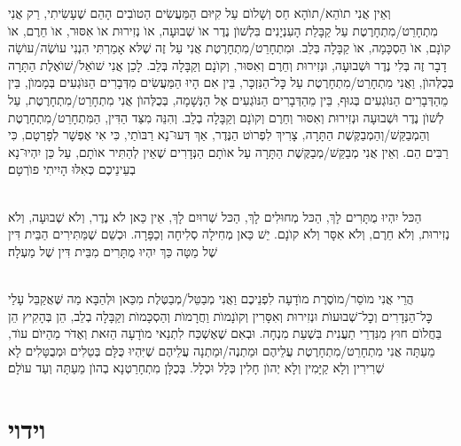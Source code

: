 \documentclass[twoside, openany, parskip=half, 11pt]{book}
\begin{document}
וְאֵין אֲנִי תוׂהֵא/תוׂהָא חַס וְשָׁלוׂם עַל קִיּוּם הַמַּעֲשִׂים הַטוׂבִים הָהֵם שֶׁעָשִׂיתִי, רַק אֲנִי מִתְחָרֵט/מִתְחָרֶטֶת עַל קַבָּלַת הָעִנְיָנִים בִּלְשׁוׂן נֶדֶר אוׂ שְׁבוּעָה, אוׂ נְזִירוּת אוׂ אִסּוּר, אוׂ חֵרֶם, אוׂ קוׂנָם, אוׂ הַסְכָּמָה, אוׂ קַבָּלָה בְּלֵב. וּמִתְחָרֵט/מִתְחָרֶטֶת אֲנִי עַל זֶה שֶׁלּא אָמַרְתִּי הִנְנִי עוׂשֶׂה/עוׂשָׂה דָבָר זֶה בְּלִי נֶדֶר וּשְׁבוּעָה, וּנְזִירוּת וְחֵרֶם וְאִסּוּר, וְקוׂנָם וְקַבָּלָה בְּלֵב. לָכֵן אֲנִי שׁוׂאֵל/שׁוׂאֶלֶת הַתָּרָה בְּכֻלְּהוׂן, וַאֲנִי מִתְחָרֵט/מִתְחָרֶטֶת עַל כׇּל־הַנִּזְכָּר, בֵּין אִם הָיוּ הַמַּעֲשִׂים מִדְּבָרִים הַנּוׂגְעִים בְּמָמוׂן, בֵּין מֵהַדְּבָרִים הַנּוׂגְעִים בְּגוּף, בֵּין מֵהַדְּבָרִים הַנּוׂגְעִים אֶל הַנְּשָׁמָה, בְּכֻלְּהוׂן אֲנִי מִתְחָרֵט/מִתְחָרֶטֶת, עַל לְשׁוׂן נֶדֶר וּשְׁבוּעָה וּנְזִירוּת וְאִסּוּר וְחֵרֶם וְקוׂנָם וְקַבָּלָה בְלֵב. וְהִנֵּה מִצַּד הַדִּין, הַמִּתְחָרֵט/מִתְחָרֶטֶת וְהַמְבַקֵּשׁ/וְהַמְבַקֶּשֶׁת הַתָּרָה, צָרִיךְ לִפְרוׂט הַנֶּדֶר, אַךְ דְּעוּ־נָא רַבּוׂתַי, כִּי אִי אֶפְשָׁר לְפָרְטָם, כִּי רַבִּים הֵם. וְאֵין אֲנִי מְבַקֵּשׁ/מְבַקֶּשֶׁת הַתָּרָה עַל אוׂתָם הַנְּדָרִים שֶׁאֵין לְהַתִּיר אוׂתָם, עַל כֵּן יִהְיוּ־נָא בְעֵינֵיכֶם כְּאִלּוּ הָיִיתִי פוׂרְטָם׃

\\
הַכּל יִהְיוּ מֻתָּרִים לָךְ, הַכּל מְחוּלִים לָךְ, הַכּל שְׁרוּיִם לָךְ, אֵין כַּאן לֺא נֶדֶר, וְלֺא שְׁבוּעָה, וְלֺא נְזִירוּת, וְלֺא חֵרֶם, וְלֺא אִסָּר וְלֺא קוׂנָם. יֵשׁ כַּאן מְחִילָה סְלִיחָה וְכַפָּרָה. וּכְשֵׁם שֶׁמַּתִּירִים הַבֵּית דִּין שֶׁל מַטָּה כַּךְ יִהְיוּ מֻתָּרִים מִבֵּית דִּין שֶׁל מַעְלָה׃

\\
הֲרֵי אֲנִי מוֺסֵר/מוֺסֶרֶת מוׂדָעָה לִפְנֵיכֶם וַאֲנִי מְבַטֵּל/מְבַטֶּלֶת מִכַּאן וּלְהַבָּא מַה שֶּׁאֲקַבֵּל עָלַי כׇּל־הַנְּדָרִים וְכׇל־שְׁבוּעוׂת וּנְזִירוּת וְאִסָּרִין וְקוׂנָמוׂת וַחֲרָמוׂת וְהַסְכָּמוׂת וְקַבָּלָה בְלֵב, הֵן בְּהָקִיץ הֵן בַּחֲלוׂם חוּץ מִנִּדְרֵי תַעֲנִית בִּשְׁעַת מִנְחָה. וּבְאִם שֶׁאֶשְׁכַּח לִתְנַאי מוׂדָעָה הַזּאת וְאֶדּׂר מֵהַיּוׂם עוׂד, מֵעַתָּה אֲנִי מִתְחָרֵט/מִתְחָרֶטֶת עֲלֵיהֶם וּמַתְנֶה/וּמַתְנָה עֲלֵיהֶם שֶׁיִּהְיוּ כֻּלָּם בְּטֵלִים וּמְבֻטָּלִים לָא שְׁרִירִין וְלָא קַיָּמִין וְלָא יְהוׂן חָלִין כְּלָל וּכְלָל. בְּכֻלָּן מִתְחָרַטְנָא בְהוׂן מֵעַתָּה וְעַד עוׂלָם׃

\vfill
\sepline




\chapter[וידוי]{ וידוי }
\end{document}
